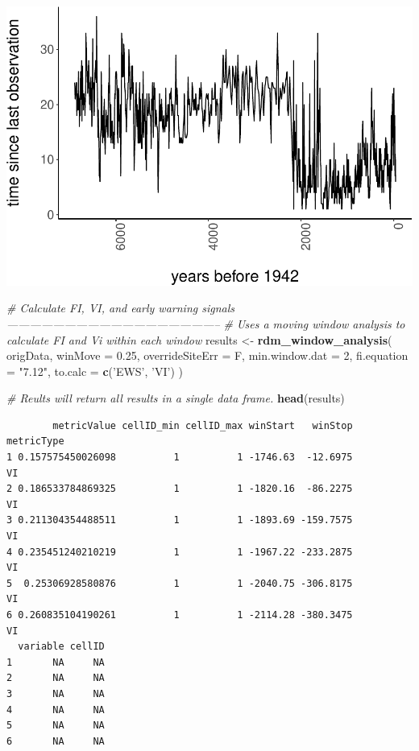 \documentclass[12pt,twoside,openany]{reedthesis}
\newenvironment{Shaded}{\begin{snugshade}}{\end{snugshade}}
\newcommand{\KeywordTok}[1]{\textcolor[rgb]{0.13,0.29,0.53}{\textbf{#1}}}
\newcommand{\DataTypeTok}[1]{\textcolor[rgb]{0.13,0.29,0.53}{#1}}
\newcommand{\DecValTok}[1]{\textcolor[rgb]{0.00,0.00,0.81}{#1}}
\newcommand{\FloatTok}[1]{\textcolor[rgb]{0.00,0.00,0.81}{#1}}
\newcommand{\StringTok}[1]{\textcolor[rgb]{0.31,0.60,0.02}{#1}}
\newcommand{\CommentTok}[1]{\textcolor[rgb]{0.56,0.35,0.01}{\textit{#1}}}
\newcommand{\NormalTok}[1]{#1}
\begin{document}
\includegraphics{_myDissertation_files/figure-latex/unnamed-chunk-10-1.pdf}
\begin{Shaded}
\begin{Highlighting}[]
\CommentTok{# Calculate FI, VI, and early warning signals --------------------------------------------------------}
\CommentTok{# Uses a moving window analysis to calculate FI and Vi within each window}
\NormalTok{results <-}
\StringTok{    }\KeywordTok{rdm_window_analysis}\NormalTok{(}
\NormalTok{        origData,}
        \DataTypeTok{winMove =} \FloatTok{0.25}\NormalTok{,}
        \DataTypeTok{overrideSiteErr =}\NormalTok{ F,}
        \DataTypeTok{min.window.dat =} \DecValTok{2}\NormalTok{,}
        \DataTypeTok{fi.equation =} \StringTok{"7.12"}\NormalTok{,}
        \DataTypeTok{to.calc =} \KeywordTok{c}\NormalTok{(}\StringTok{'EWS'}\NormalTok{, }\StringTok{'VI'}\NormalTok{)}
\NormalTok{    )}

\CommentTok{# Reults will return all results in a single data frame.}
\KeywordTok{head}\NormalTok{(results)}
\end{Highlighting}
\end{Shaded}
\begin{verbatim}
        metricValue cellID_min cellID_max winStart   winStop metricType
1 0.157575450026098          1          1 -1746.63  -12.6975         VI
2 0.186533784869325          1          1 -1820.16  -86.2275         VI
3 0.211304354488511          1          1 -1893.69 -159.7575         VI
4 0.235451240210219          1          1 -1967.22 -233.2875         VI
5  0.25306928580876          1          1 -2040.75 -306.8175         VI
6 0.260835104190261          1          1 -2114.28 -380.3475         VI
  variable cellID
1       NA     NA
2       NA     NA
3       NA     NA
4       NA     NA
5       NA     NA
6       NA     NA
\end{verbatim}
\end{document}
